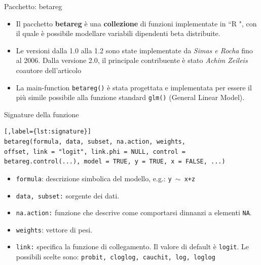 \documentclass[usenames,dvipsnames]{beamer}
\begin{document}
\begin{frame}[fragile]{Pacchetto: betareg}
\begin{itemize}
	\item Il pacchetto \textbf{betareg} è una \textbf{collezione} di funzioni implementate in ``R ",  con il quale è possibile modellare variabili dipendenti beta distribuite.
	\item Le versioni dalla 1.0 alla 1.2 sono state implementate da \emph{Simas e Rocha} fino al 2006. Dalla versione 2.0, il principale contribuente è stato \emph{Achim Zeileis} coautore dell'articolo
	\item 	La main-function \texttt{betareg()} è stata progettata e implementata per essere il più simile possibile alla funzione standard \texttt{glm()} (General Linear Model).
	
\end{itemize}
 


\end{frame}

\begin{frame}[fragile]{Signature della funzione}
\vspace{-0.5cm}
\begin{lstlisting}[,label={lst:signature}]
betareg(formula, data, subset, na.action, weights, 
offset, link = "logit", link.phi = NULL, control = betareg.control(...), model = TRUE, y = TRUE, x = FALSE, ...)
\end{lstlisting}
\begin{itemize}[<+->]
	\item \texttt{formula}: descrizione simbolica del modello, e.g.: \texttt{y $\sim$ x+z}
	\item \texttt{data, subset:} sorgente dei dati.
	\item \texttt{na.action:} funzione che descrive come comportarsi dinnanzi a elementi \texttt{NA}.
	\item \texttt{weights}: vettore di pesi. 
	\item \texttt{link:} specifica la funzione di collegamento. Il valore di default è \texttt{logit}. Le possibili scelte sono: \texttt{probit, cloglog, cauchit, log, loglog}
\end{itemize}

\end{frame}
\end{document}
